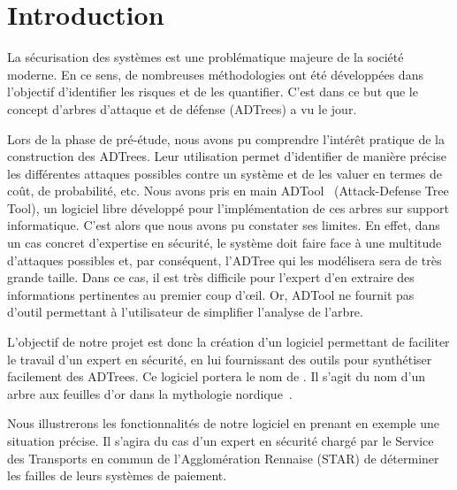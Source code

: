 \section{Introduction}
	La sécurisation des systèmes est une problématique majeure de la société moderne. En ce sens, de nombreuses méthodologies ont été développées \cite{introSecurite} dans l'objectif d'identifier les risques et de les quantifier. C'est dans ce but que le concept d'arbres d'attaque et de défense (ADTrees) a vu le jour.

	Lors de la phase de pré-étude, nous avons pu comprendre l’intérêt pratique de la construction des ADTrees. Leur utilisation permet d'identifier de manière précise les différentes attaques possibles contre un système et de les valuer en termes de coût, de probabilité, etc. Nous avons pris en main ADTool~\cite{adtool_paper} (Attack-Defense Tree Tool), un logiciel libre développé pour l'implémentation de ces arbres sur support informatique. C'est alors que nous avons pu constater ses limites. En effet, dans un cas concret d'expertise en sécurité, le système doit faire face à une multitude d'attaques possibles et, par conséquent, l'ADTree qui les modélisera sera de très grande taille. Dans ce cas, il est très difficile pour l'expert d'en extraire des informations pertinentes au premier coup d’œil. Or, ADTool ne fournit pas d'outil permettant à l'utilisateur de simplifier l'analyse de l'arbre. 

	L'objectif de notre projet est donc la création d'un logiciel permettant de faciliter le travail d'un expert en sécurité, en lui fournissant des outils pour synthétiser facilement des ADTrees. Ce logiciel portera le nom de \glasir. Il s'agit du nom d'un arbre aux feuilles d'or dans la mythologie nordique~\cite{vikingCulture}.

	Nous illustrerons les fonctionnalités de notre logiciel en prenant en exemple une situation précise. Il s'agira du cas d'un expert en sécurité chargé par le Service des Transports en commun de l'Agglomération Rennaise (STAR) de déterminer les failles de leurs systèmes de paiement.